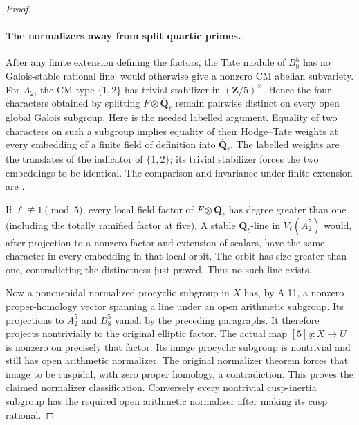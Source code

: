 \begin{proof}
\paragraph{The normalizers away from split quartic primes.}
After any finite extension defining the factors, the Tate module
of \(B_8^5\) has no Galois-stable rational line:
\cite[\S1, Corollary 1]{Ruppert1998} would otherwise give a
nonzero CM abelian subvariety. For \(A_2\), the CM type
\(\{1,2\}\) has trivial stabilizer in
\((\mathbf Z/5)^\times\). Hence the four characters obtained
by splitting \(F\otimes\overline{\mathbf Q}_\ell\)
remain pairwise distinct on every open global Galois subgroup.
Here is the needed labelled argument. Equality of two characters
on such a subgroup implies equality of their Hodge--Tate weights
at every embedding of a finite field of definition into
\(\overline{\mathbf Q}_\ell\). The labelled weights are the
translates of the indicator of \(\{1,2\}\); its trivial
stabilizer forces the two embeddings to be identical.
The comparison and invariance under finite extension are
\cite[Theorems 2.2.3 and 2.4.6, pp.13 and 20]{fghBrinonConrad}.

If \(\ell\not\equiv1\pmod5\), every local field factor of
\(F\otimes\mathbf Q_\ell\) has degree greater than one
(including the totally ramified factor at five). A stable
\(\mathbf Q_\ell\)-line in \(V_\ell(A_2^5)\) would, after
projection to a nonzero factor and extension of scalars, have
the same character in every embedding in that local orbit.
The orbit has size greater than one, contradicting the
distinctness just proved. Thus no such line exists.

Now a noncuspidal normalized procyclic subgroup in \(X\)
has, by A.11, a nonzero proper-homology vector spanning a
line under an open arithmetic subgroup. Its projections to
\(A_2^5\) and \(B_8^5\) vanish by the preceding paragraphs.
It therefore projects nontrivially to the original elliptic
factor. The actual map \([5]q:X\to U\) is nonzero on precisely
that factor. Its image procyclic subgroup is nontrivial and
still has open arithmetic normalizer. The original normalizer
theorem forces that image to be cuspidal, with zero proper
homology, a contradiction. This proves the claimed normalizer
classification. Conversely every nontrivial cusp-inertia subgroup
has the required open arithmetic normalizer after making its
cusp rational.


\end{proof}
